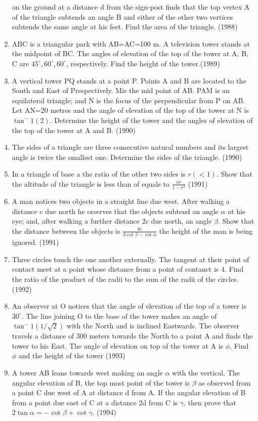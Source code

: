 \documentclass[12pt]{article}
\begin{document}
\begin{enumerate}
on the ground at a distance d from the sign-post finds that the top vertex A of the triangle subtends an angle B and either of the other two vertices subtends the same angle at his feet. Find the area of the triangle. (1988)
\item ABC is a triangular park with AB=AC=100 m. A television tower stands at the midpoint of BC. The angles of elevation of the top of the tower at A, B, C are $45^\circ,60^\circ,60^\circ$, respectively. Find the height of the tower.(1989)
\item  A vertical tower PQ stands at a point P. Points A and B are located to the South and East of Prespectively. Mis the mid point of AB. PAM is an equilateral triangle; and N is the focus of the perpendicular from P on AB. Let AN=20 metres and the angle of elevation of the top of the tower at N is $\tan^-1(2)$. Determine the height of the tower and the angles of elevation of the top of the tower at A and B. (1990)
\item The sides of a triangle are three consecutive natural numbers and its largest angle is twice the smallest one. Determine the sides of the triangle. (1990)
\item In a triangle of base a the ratio of the other two sides is $r(<1)$. Show that the altitude of the triangle is less than of equals to $\frac{ar}{1-r^2}$ (1991)
\item A man notices two objects in a straight line due west. After walking a distance c due north he orserves that the objects subtend an angle $\alpha$ at his eye; and, after walking a further distance 2c due north, an angle $\beta$. Show that the distance between the objects is $\frac{8c}{3\cot \beta-\cot \alpha}$ the height of the man is being ignored. (1991)
\item Three circles touch the one another externally. The tangent at their point of contact meet at a point whose distance from a point of contanct is 4. Find the ratio of the product of the radii to the sum of the radii of the circles. (1992)
\item An observer at O notices that the angle of elevation of the top of a tower is $30^\circ$. The line joining O to the base of the tower makes an angle of $\tan^-1 (1/\sqrt{2})$ with the North and is inclined Eastwards. The observer travels a distance of 300 meters towards the North to a point A and finds the tower to his East. The angle of elevation on top of the tower at A is $\phi$, Find $\phi$ and the height of the tower (1993)
\item A tower AB leans towards west making an angle $\alpha$ with the vertical. The angular elevation of B, the top most point of the tower is $\beta$ as observed from a point C due west of A at distance d from A. If the angular elevation of B from a point due east of C at a distance 2d from C is $\gamma$, then prove that $2\tan \alpha=-\cot \beta + \cot \gamma$. (1994)

\end{enumerate}
\end{document}
